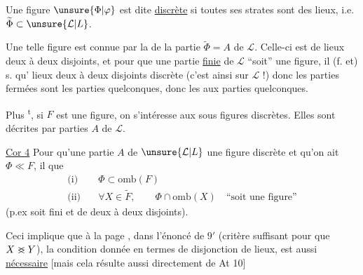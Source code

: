 
\noindent\llap{\smash{\rule[-1.7\baselineskip]{0.4pt}{1.6\baselineskip}}\enspace}\uline{}\quad Une figure  $\unsure{\Phi|\varphi}$ est dite
\uline{discrète} si toutes ses  strates sont
des lieux, i.e. $\widetilde\Phi\subset\unsure{\mathcal L|L}$.

\quad {}Une telle figure est connue
par la  de la partie $\widetilde\Phi=A$
de $\mathcal L$. Celle-ci est  de
lieux deux à deux disjoints, et 
pour que une partie \uline{finie} de $\mathcal L$ ``soit''
une figure, il (f. et) s. qu'
 lieux deux à deux
disjoints 
discrète (c'est ainsi sur $\mathcal L$ !) donc
les parties fermées sont les parties
quelconques, donc les  
 aux parties quelconques.

Plus \textsuperscript{t}, si $F$ est une figure,
on s'intéresse aux sous figures discrètes.
Elles sont décrites par  
parties $A$ de $\mathcal L$.

\uline{Cor 4}\quad {} Pour qu'une partie $A$ de
$\unsure{\mathcal L|L}$  une figure discrète\inserted{$\unsure{\Phi|\varphi}$} et qu'on
ait $\Phi\ll F$, il  que
\[
\begin{aligned}
\text{(i)}\quad &\Phi\subset\mathrm{omb}(F)\\
\text{(ii)}\quad &\forall X\in\widetilde F,\qquad \Phi\cap\mathrm{omb}(X)\quad \text{``soit une figure''}
\end{aligned}
\]
(p.ex soit fini et  de   deux à deux
disjoints).

Ceci implique  que à la
page , dans l'énoncé de  $9'$
(critère suffisant pour que $X\mathrel{\rlap{$<$}{>}}Y$), la
condition donnée  en termes
de disjonction de lieux, est aussi
\uline{nécessaire} [mais cela résulte aussi directement
de At 10]

